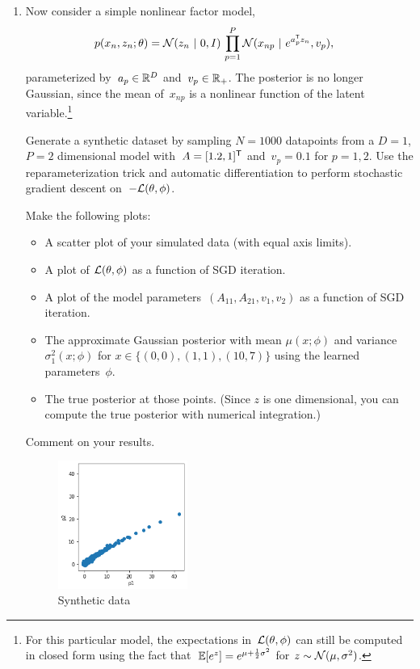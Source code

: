 \documentclass[11pt]{article}
\begin{document}
\begin{enumerate}[label=(\alph*)]
    \item Now consider a simple nonlinear factor model,
    \begin{align*}
        p(x_n, z_n; \theta) &= \mathcal{N}(z_n ~\vert~ 0, I) \, \prod_{p=1}^P \mathcal{N}(x_{np} ~\vert~ e^{a_p^{\mathsf{T}} z_n}, v_p),
    \end{align*}
    parameterized by~$a_p \in \mathbb{R}^D$ and~$v_p \in \mathbb{R}_+$.  The posterior is no longer Gaussian, since the mean of~$x_{np}$ is a nonlinear function of the latent variable.\footnote{For this particular model, the expectations in~$\mathcal{L}(\theta, \phi)$ can still be computed in closed form using the fact that~$\mathbb{E}[e^z] = e^{\mu + \frac{1}{2}\sigma^2}$ for $z \sim \mathcal{N}(\mu, \sigma^2)$.}  
    
    Generate a synthetic dataset by sampling $N=1000$ datapoints from a $D=1$, $P=2$ dimensional model with~$A = [1.2, 1]^{\mathsf{T}}$ and~$v_p = 0.1$ for $p=1,2$.  Use the reparameterization trick and automatic differentiation to perform stochastic gradient descent on~$-\mathcal{L}(\theta, \phi)$.
    
    Make the following plots: 
    \begin{itemize}
        \item A scatter plot of your simulated data (with equal axis limits).
        \item A plot of $\mathcal{L}(\theta, \phi)$ as a function of SGD iteration. 
        \item A plot of the model parameters~$(A_{11}, A_{21}, v_1, v_2)$ as a function of SGD iteration.
        \item The approximate Gaussian posterior with mean $\mu(x; \phi)$ and variance~$\sigma_1^2(x; \phi)$ for $x \in \{(0, 0), (1, 1), (10, 7)\}$ using the learned parameters~$\phi$.
        \item The true posterior at those points. (Since $z$ is one dimensional, you can compute the true posterior with numerical integration.)
    \end{itemize}
    Comment on your results.
    
    \begin{solution}
    
    \begin{figure}
        \centering
        \includegraphics[width=0.4\textwidth]{2c_1_synthetic-data.png}
        \caption{Synthetic data}
    \end{figure}


\end{solution}
\end{enumerate}
\end{document}
